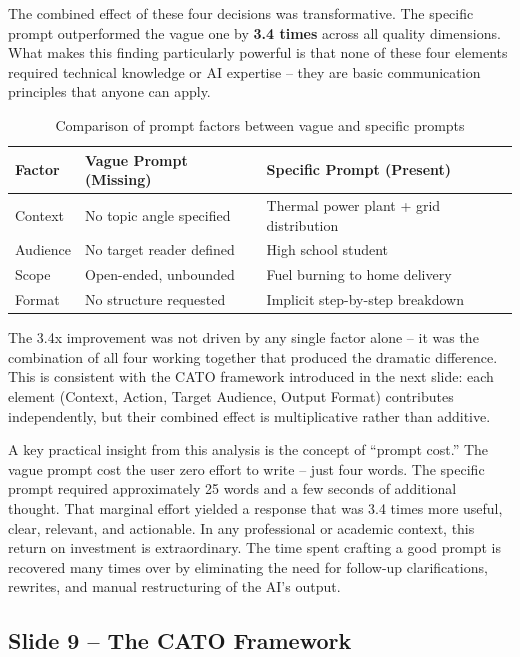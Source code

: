 \documentclass[12pt,a4paper]{article}
\begin{document}
The combined effect of these four decisions was transformative. The specific prompt outperformed the vague one by \textbf{3.4 times} across all quality dimensions. What makes this finding particularly powerful is that none of these four elements required technical knowledge or AI expertise -- they are basic communication principles that anyone can apply.

\begin{table}[H]
\centering
\begin{tabular}{p{3.5cm}p{4cm}p{4cm}}
\toprule
\textbf{Factor} & \textbf{Vague Prompt (Missing)} & \textbf{Specific Prompt (Present)} \\
\midrule
Context & No topic angle specified & Thermal power plant + grid distribution \\
Audience & No target reader defined & High school student \\
Scope & Open-ended, unbounded & Fuel burning to home delivery \\
Format & No structure requested & Implicit step-by-step breakdown \\
\bottomrule
\end{tabular}
\caption{Comparison of prompt factors between vague and specific prompts}
\end{table}

The 3.4x improvement was not driven by any single factor alone -- it was the combination of all four working together that produced the dramatic difference. This is consistent with the CATO framework introduced in the next slide: each element (Context, Action, Target Audience, Output Format) contributes independently, but their combined effect is multiplicative rather than additive.

A key practical insight from this analysis is the concept of ``prompt cost.'' The vague prompt cost the user zero effort to write -- just four words. The specific prompt required approximately 25 words and a few seconds of additional thought. That marginal effort yielded a response that was 3.4 times more useful, clear, relevant, and actionable. In any professional or academic context, this return on investment is extraordinary. The time spent crafting a good prompt is recovered many times over by eliminating the need for follow-up clarifications, rewrites, and manual restructuring of the AI's output.

\newpage

\subsection*{Slide 9 -- The CATO Framework}
\label{sec:s9}
\end{document}
